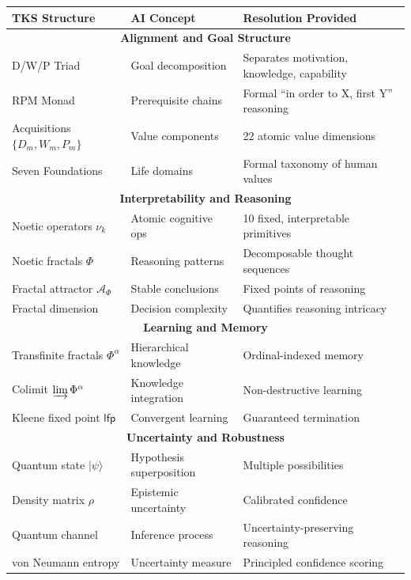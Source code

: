 \documentclass[11pt,twoside]{article}
\theoremstyle{definition}
\theoremstyle{plain}
\theoremstyle{remark}
\newcommand{\noe}[1]{\nu_{#1}}
\newcommand{\Frac}{\Phi}
\newcommand{\qket}[1]{|#1\rangle}
\newcommand{\DensityMat}{\rho}
\newcommand{\TransFrac}[1]{\Phi^{#1}}
\newcommand{\FractalAttractor}{\mathcal{A}_\Phi}
\newcommand{\KleeneFix}{\mathsf{lfp}}
\begin{document}
\begin{center}
\renewcommand{\arraystretch}{1.3}
\begin{tabularx}{\textwidth}{|l|X|X|}
\hline
\textbf{TKS Structure} & \textbf{AI Concept} & \textbf{Resolution Provided} \\
\hline
\hline
\multicolumn{3}{|c|}{\textbf{Alignment and Goal Structure}} \\
\hline
D/W/P Triad & Goal decomposition & Separates motivation, knowledge, capability \\
\hline
RPM Monad & Prerequisite chains & Formal ``in order to X, first Y'' reasoning \\
\hline
Acquisitions $\{D_m, W_m, P_m\}$ & Value components & 22 atomic value dimensions \\
\hline
Seven Foundations & Life domains & Formal taxonomy of human values \\
\hline
\hline
\multicolumn{3}{|c|}{\textbf{Interpretability and Reasoning}} \\
\hline
Noetic operators $\noe{k}$ & Atomic cognitive ops & 10 fixed, interpretable primitives \\
\hline
Noetic fractals $\Frac$ & Reasoning patterns & Decomposable thought sequences \\
\hline
Fractal attractor $\FractalAttractor$ & Stable conclusions & Fixed points of reasoning \\
\hline
Fractal dimension & Decision complexity & Quantifies reasoning intricacy \\
\hline
\hline
\multicolumn{3}{|c|}{\textbf{Learning and Memory}} \\
\hline
Transfinite fractals $\TransFrac{\alpha}$ & Hierarchical knowledge & Ordinal-indexed memory \\
\hline
Colimit $\varinjlim \TransFrac{\alpha}$ & Knowledge integration & Non-destructive learning \\
\hline
Kleene fixed point $\KleeneFix$ & Convergent learning & Guaranteed termination \\
\hline
\hline
\multicolumn{3}{|c|}{\textbf{Uncertainty and Robustness}} \\
\hline
Quantum state $\qket{\psi}$ & Hypothesis superposition & Multiple possibilities \\
\hline
Density matrix $\DensityMat$ & Epistemic uncertainty & Calibrated confidence \\
\hline
Quantum channel & Inference process & Uncertainty-preserving reasoning \\
\hline
von Neumann entropy & Uncertainty measure & Principled confidence scoring \\

\end{tabularx}
\end{center}
\end{document}
